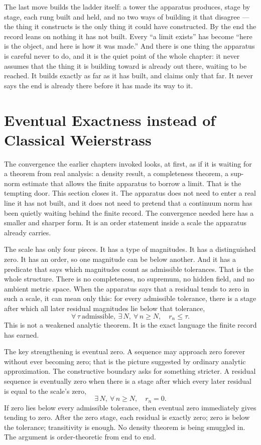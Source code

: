 The last move builds the ladder itself: a tower the apparatus produces, stage by stage, each rung built and held, and no two ways of building it that disagree --- the thing it constructs is the only thing it could have constructed. By the end the record leans on nothing it has not built. Every ``a limit exists'' has become ``here is the object, and here is how it was made.'' And there is one thing the apparatus is careful never to do, and it is the quiet point of the whole chapter: it never assumes that the thing it is building toward is already out there, waiting to be reached. It builds exactly as far as it has built, and claims only that far. It never says the end is already there before it has made its way to it.

\section{Eventual Exactness instead of Classical Weierstrass}

The convergence the earlier chapters invoked looks, at first, as if it is waiting
for a theorem from real analysis: a density result, a completeness theorem, a
sup-norm estimate that allows the finite apparatus to borrow a limit. That is the
tempting door. This section closes it. The apparatus does not need to enter a real
line it has not built, and it does not need to pretend that a continuum norm has been
quietly waiting behind the finite record. The convergence needed here has a smaller
and sharper form. It is an order statement inside a scale the apparatus already
carries.

The scale has only four pieces. It has a type of magnitudes. It has a distinguished
zero. It has an order, so one magnitude can be below another. And it has a predicate
that says which magnitudes count as admissible tolerances. That is the whole
structure. There is no completeness, no supremum, no hidden field, and no ambient
metric space. When the apparatus says that a residual tends to zero in such a scale,
it can mean only this: for every admissible tolerance, there is a stage after which
all later residual magnitudes lie below that tolerance,
\[
  \forall\,\tau\ \text{admissible},\ \exists\,N,\ \forall\,n\ge N,\quad
  r_n \le \tau .
\]
This is not a weakened analytic theorem. It is the exact language the finite record
has earned.

The key strengthening is eventual zero. A sequence may approach zero forever without
ever becoming zero; that is the picture suggested by ordinary analytic
approximation. The constructive boundary asks for something stricter. A residual
sequence is eventually zero when there is a stage after which every later residual is
equal to the scale's zero,
\[
  \exists\,N,\ \forall\,n\ge N,\quad r_n = 0 .
\]
If zero lies below every admissible tolerance, then eventual zero immediately gives
tending to zero. After the zero stage, each residual is exactly zero; zero is below
the tolerance; transitivity is enough. No density theorem is being smuggled in. The
argument is order-theoretic from end to end.

